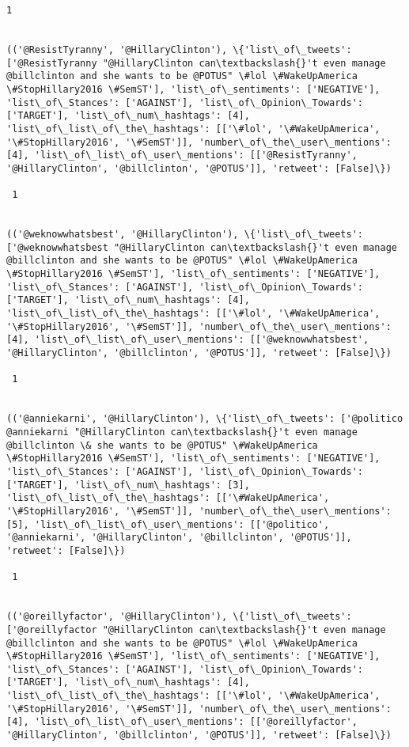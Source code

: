 \documentclass[11pt]{article}
\begin{document}
\begin{Verbatim}[commandchars=\\\{\}]
 1
 

(('@ResistTyranny', '@HillaryClinton'), \{'list\_of\_tweets': ['@ResistTyranny "@HillaryClinton can\textbackslash{}'t even manage @billclinton and she wants to be @POTUS" \#lol \#WakeUpAmerica \#StopHillary2016 \#SemST'], 'list\_of\_sentiments': ['NEGATIVE'], 'list\_of\_Stances': ['AGAINST'], 'list\_of\_Opinion\_Towards': ['TARGET'], 'list\_of\_num\_hashtags': [4], 'list\_of\_list\_of\_the\_hashtags': [['\#lol', '\#WakeUpAmerica', '\#StopHillary2016', '\#SemST']], 'number\_of\_the\_user\_mentions': [4], 'list\_of\_list\_of\_user\_mentions': [['@ResistTyranny', '@HillaryClinton', '@billclinton', '@POTUS']], 'retweet': [False]\})

 1
 

(('@weknowwhatsbest', '@HillaryClinton'), \{'list\_of\_tweets': ['@weknowwhatsbest "@HillaryClinton can\textbackslash{}'t even manage @billclinton and she wants to be @POTUS" \#lol \#WakeUpAmerica \#StopHillary2016 \#SemST'], 'list\_of\_sentiments': ['NEGATIVE'], 'list\_of\_Stances': ['AGAINST'], 'list\_of\_Opinion\_Towards': ['TARGET'], 'list\_of\_num\_hashtags': [4], 'list\_of\_list\_of\_the\_hashtags': [['\#lol', '\#WakeUpAmerica', '\#StopHillary2016', '\#SemST']], 'number\_of\_the\_user\_mentions': [4], 'list\_of\_list\_of\_user\_mentions': [['@weknowwhatsbest', '@HillaryClinton', '@billclinton', '@POTUS']], 'retweet': [False]\})

 1
 

(('@anniekarni', '@HillaryClinton'), \{'list\_of\_tweets': ['@politico @anniekarni "@HillaryClinton can\textbackslash{}'t even manage @billclinton \& she wants to be @POTUS" \#WakeUpAmerica \#StopHillary2016 \#SemST'], 'list\_of\_sentiments': ['NEGATIVE'], 'list\_of\_Stances': ['AGAINST'], 'list\_of\_Opinion\_Towards': ['TARGET'], 'list\_of\_num\_hashtags': [3], 'list\_of\_list\_of\_the\_hashtags': [['\#WakeUpAmerica', '\#StopHillary2016', '\#SemST']], 'number\_of\_the\_user\_mentions': [5], 'list\_of\_list\_of\_user\_mentions': [['@politico', '@anniekarni', '@HillaryClinton', '@billclinton', '@POTUS']], 'retweet': [False]\})

 1
 

(('@oreillyfactor', '@HillaryClinton'), \{'list\_of\_tweets': ['@oreillyfactor "@HillaryClinton can\textbackslash{}'t even manage @billclinton and she wants to be @POTUS" \#lol \#WakeUpAmerica \#StopHillary2016 \#SemST'], 'list\_of\_sentiments': ['NEGATIVE'], 'list\_of\_Stances': ['AGAINST'], 'list\_of\_Opinion\_Towards': ['TARGET'], 'list\_of\_num\_hashtags': [4], 'list\_of\_list\_of\_the\_hashtags': [['\#lol', '\#WakeUpAmerica', '\#StopHillary2016', '\#SemST']], 'number\_of\_the\_user\_mentions': [4], 'list\_of\_list\_of\_user\_mentions': [['@oreillyfactor', '@HillaryClinton', '@billclinton', '@POTUS']], 'retweet': [False]\})


\end{Verbatim}
\end{document}
